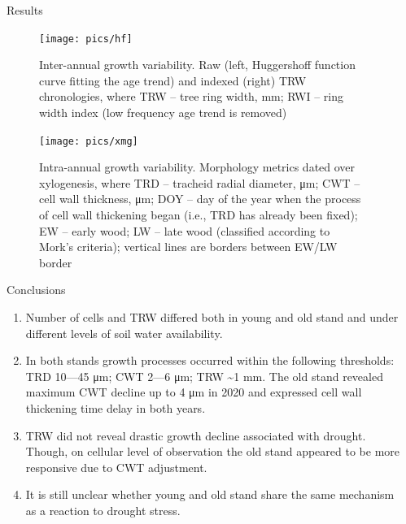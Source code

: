 \documentclass[final]{beamer}
\newlength{\sepwidth}
\newlength{\colwidth}
\newcommand{\separatorcolumn}{\begin{column}{\sepwidth}\end{column}}
\begin{document}
\begin{frame}[t]
\begin{columns}[t]
\begin{column}{\colwidth}
\end{column}


\begin{column}{\colwidth}

\begin{block}{Results}
        \begin{figure}
            \centering \texttt{[image: pics/hf]}
            \caption{Inter-annual growth variability. Raw (left, Huggershoff function curve fitting the age trend) and indexed (right) TRW chronologies, where TRW -- tree ring width, \si{mm}; RWI -- ring width index (low frequency age trend is removed)}
            \label{fig:hf}
        \end{figure}
        \begin{figure}
            \centering \texttt{[image: pics/xmg]}
            \caption{Intra-annual growth variability. Morphology metrics dated over xylogenesis, where TRD -- tracheid radial diameter, \si{\micro\meter}; CWT -- cell wall thickness, \si{\micro\meter}; DOY -- day of the year when the process of cell wall thickening began (i.e., TRD has already been fixed); EW -- early wood; LW -- late wood (classified according to Mork's criteria); vertical lines are borders between EW/LW border}
            \label{fig:xmg}
        \end{figure}
\end{block}

\begin{block}{Conclusions}
    \begin{enumerate}
        \item Number of cells and TRW differed both in young and old stand and under different levels of soil water availability.
        \item In both stands growth processes occurred within the following thresholds: TRD 10---45 \si{\micro\meter}; CWT 2---6 \si{\micro\meter}; TRW \sim1 \si{mm}. The old stand revealed maximum CWT decline up to 4 \si{\micro\meter} in 2020 and expressed cell wall thickening time delay in both years.
        \item TRW did not reveal drastic growth decline associated with drought. Though, on cellular level of observation the old stand appeared to be more responsive due to CWT adjustment.
        \item It is still unclear whether young and old stand share the same mechanism as a reaction to drought stress.
    \end{enumerate}
\end{block}

\end{column}
\end{columns}

%
%
%
\end{frame}
\end{document}
